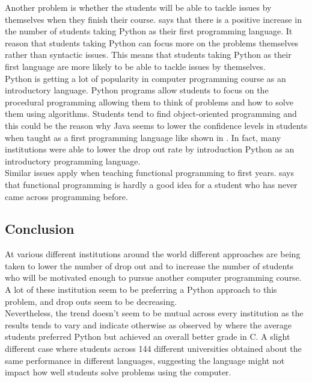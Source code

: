 \documentclass[a4paper]{article}
\begin{document}
\begin{appendices}
	Another problem is whether the students will be able to tackle issues by themselves when they finish their course. \textcite{JayalLauriaTuckerSwift2011} says that there is a positive increase in the number of students taking Python as their first programming language. It reason that students taking Python can focus more on the problems themselves rather than syntactic issues. This means that students taking Python as their first language are more likely to be able to tackle issues by themselves.\\
	
	Python is getting a lot of popularity in computer programming course as an introductory language. \parencite{Yadin2011} Python programs allow students to focus on the procedural programming allowing them to think of problems and how to solve them using algorithms. Students tend to find object-oriented programming and this could be the reason why Java seems to lower the confidence levels in students when taught as a first programming language like shown in \textcite{Daly2011}. In fact, many institutions were able to lower the drop out rate by introduction Python as an introductory programming language. \parencite{NikulaSajaniemiTedreWray2007}\\
	
	Similar issues apply when teaching functional programming to first years. \textcite{ChakravartyKeller2004} says that functional programming is hardly a good idea for a student who has never came across programming before. 
	
	\subsection{Conclusion}
	At various different institutions around the world different approaches are being taken to lower the number of drop out and to increase the number of students who will be motivated enough to pursue another computer programming course. A lot of these institution seem to be preferring a Python approach to this problem, and drop outs seem to be decreasing. \parencite{JayalLauriaTuckerSwift2011}\\
	
	Nevertheless, the trend doesn't seem to be mutual across every institution as the results tends to vary and indicate otherwise as observed by \textcite{KrpanBilobrk2011} where the average students preferred Python but achieved an overall better grade in C. A slight different case where students across 144 different universities obtained about the same performance in different languages, suggesting the language might not impact how well students solve problems using the computer. \parencite{WatsonLi2014}\\
	

\end{appendices}
\end{document}

